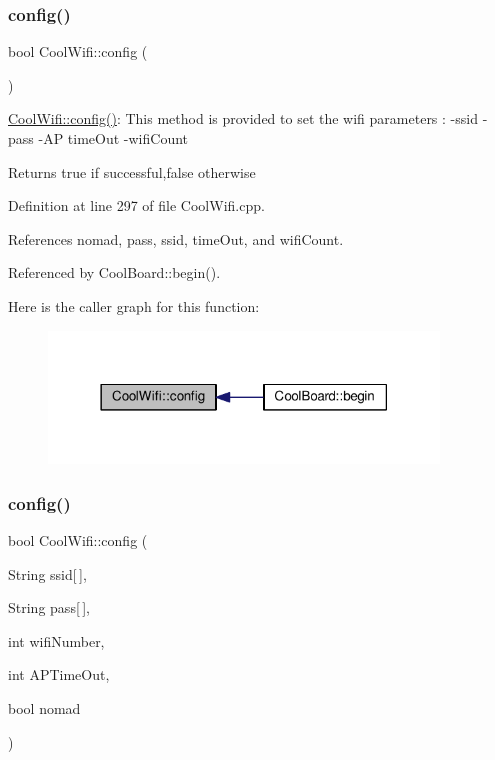 \subsubsection{\texorpdfstring{config()}{config()}\hspace{0.1cm}{\footnotesize\ttfamily [1/2]}}
{\footnotesize\ttfamily bool Cool\+Wifi\+::config (\begin{DoxyParamCaption}{ }\end{DoxyParamCaption})}

\hyperlink{class_cool_wifi_a4eb2f6b9b09dd588964b88b6c70122c0}{Cool\+Wifi\+::config()}\+: This method is provided to set the wifi parameters \+: -\/ssid -\/pass -\/\+AP time\+Out -\/wifi\+Count

\begin{DoxyReturn}{Returns}
true if successful,false otherwise 
\end{DoxyReturn}


Definition at line 297 of file Cool\+Wifi.\+cpp.



References nomad, pass, ssid, time\+Out, and wifi\+Count.



Referenced by Cool\+Board\+::begin().

Here is the caller graph for this function\+:
\nopagebreak
\begin{figure}[H]
\begin{center}
\leavevmode
\includegraphics[width=294pt]{d7/d29/class_cool_wifi_a4eb2f6b9b09dd588964b88b6c70122c0_icgraph}
\end{center}
\end{figure}
\mbox{\label{class_cool_wifi_a2a9a546f76816c8c5c8e2d46a6c4f07d}} 
\subsubsection{\texorpdfstring{config()}{config()}\hspace{0.1cm}{\footnotesize\ttfamily [2/2]}}
{\footnotesize\ttfamily bool Cool\+Wifi\+::config (\begin{DoxyParamCaption}\item[{String}]{ssid\mbox{[}$\,$\mbox{]},  }\item[{String}]{pass\mbox{[}$\,$\mbox{]},  }\item[{int}]{wifi\+Number,  }\item[{int}]{A\+P\+Time\+Out,  }\item[{bool}]{nomad }\end{DoxyParamCaption})}

